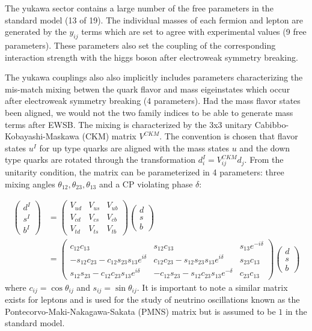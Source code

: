 The yukawa sector  contains a large number of the free parameters in the standard model (13 of 19). 
The individual masses of each fermion and lepton are generated by the $y_{ij}$
terms which are set to agree with experimental values (9 free parameters). These parameters 
also set the coupling of the corresponding interaction strength with the higgs boson after electroweak symmetry
breaking.

The yukawa couplings also also implicitly includes parameters characterizing the mis-match 
mixing betwen the quark flavor and mass eigeinstates which occur after electroweak 
symmetry breaking (4 parameters). Had the mass flavor states been aligned, we would not the two family indices to 
be able to generate mass terms after EWSB. The mixing is characterized by  the 3x3 unitary
 Cabibbo-Kobayashi-Maskawa (CKM) matrix $V^{CKM}$. The convention is chosen that flavor
 states $u^I$ for up type quarks are aligned with the mass states $u$ and the down type quarks are
rotated through the transformation $d^I_i = V^{CKM}_{ij} d_{j}$. From the unitarity condition, the matrix can be parameterized in 4 parameters: three mixing angles $\theta_{12}, \theta_{23}, \theta_{13}$ and a CP violating phase $\delta$:

\begin{align*}
\begin{pmatrix}  d^I \\ s^I \\ b^I \end{pmatrix} &=
 \begin{pmatrix} V_{ud} & V_{us} & V_{ub} \\ V_{cd} & V_{cs} & V_{cb} \\ V_{td} & V_{ts} & V_{tb} \end{pmatrix} 
\begin{pmatrix}  d \\ s \\ b \end{pmatrix}  \\
&= \begin{pmatrix} c_{12}c_{13} & s_{12} c_{13} & s_{13} e^{-i\delta} \\ 
-s_{12}c_{23} - c_{12}s_{23}s_{13}e^{i\delta} & c_{12} c_{23} - s_{12} s_{23} s_{13} e^{i\delta} & s_{23} c_{13} \\
s_{12}s_{23} - c_{12} c_{23} s_{13} e^{i\delta} & -c_{12}s_{23}-s_{12}c_{23}s_{13}e^{-\delta} & c_{23}c_{13}  \end{pmatrix} 
\begin{pmatrix}  d \\ s \\ b \end{pmatrix} 
\end{align*}
where $c_{ij} = \cos \theta_{ij}$ and $s_{ij} = \sin \theta_{ij}$. It is important to note a similar matrix exists for leptons
and is used for the study of neutrino oscillations known as the Pontecorvo-Maki-Nakagawa-Sakata (PMNS) matrix but is assumed to
be $1$ in the standard model. 

